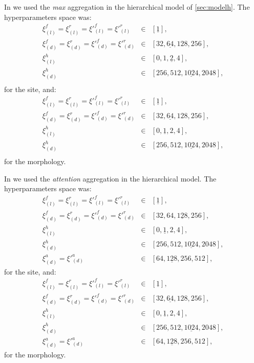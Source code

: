 In \maxh{} we used the \emph{max} aggregation in the hierarchical
model of \cref{sec:modelh}. The hyperparameters space was:
\begin{align*}
  \xi_{(l)}^f=\xi_{(l)}^r=\xi'^f_{(l)}=\xi'^r_{(l)}&\in&[\underline{1}],\\
  \xi_{(d)}^f=\xi_{(d)}^r=\xi'^f_{(d)}=\xi'^r_{(d)}&\in&[32,\underline{64},128,256],\\
  \xi_{(l)}^h&\in&[0,1,\underline{2},4],\\
  \xi_{(d)}^h&\in&[256,512,\underline{1024},2048],\\
\end{align*}
for the site, and:
\begin{align*}
  \xi_{(l)}^f=\xi_{(l)}^r=\xi'^f_{(l)}=\xi'^r_{(l)}&\in&[\underline{1}],\\
  \xi_{(d)}^f=\xi_{(d)}^r=\xi'^f_{(d)}=\xi'^r_{(d)}&\in&[32,\underline{64},128,256],\\
  \xi_{(l)}^h&\in&[0,\underline{1},2,4],\\
  \xi_{(d)}^h&\in&[256,512,\underline{1024},2048],\\
\end{align*}
for the morphology.

In \softmaxh{} we used the \emph{attention} aggregation in the
hierarchical model. The hyperparameters space was:
\begin{align*}
  \xi_{(l)}^f=\xi_{(l)}^r=\xi'^f_{(l)}=\xi'^r_{(l)}&\in&[\underline{1}],\\
  \xi_{(d)}^f=\xi_{(d)}^r=\xi'^f_{(d)}=\xi'^r_{(d)}&\in&[32,64,\underline{128},256],\\
  \xi_{(l)}^h&\in&[0,\underline{1},2,4],\\
  \xi_{(d)}^h&\in&[256,512,\underline{1024},2048],\\
  \xi_{(d)}^a=\xi'^a_{(d)}&\in&[64,\underline{128},256,512],
\end{align*}
for the site, and:
\begin{align*}
  \xi_{(l)}^f=\xi_{(l)}^r=\xi'^f_{(l)}=\xi'^r_{(l)}&\in&[\underline{1}],\\
  \xi_{(d)}^f=\xi_{(d)}^r=\xi'^f_{(d)}=\xi'^r_{(d)}&\in&[32,\underline{64},128,256],\\
  \xi_{(l)}^h&\in&[0,\underline{1},2,4],\\
  \xi_{(d)}^h&\in&[256,512,\underline{1024},2048],\\
  \xi_{(d)}^a=\xi'^a_{(d)}&\in&[64,\underline{128},256,512],
\end{align*}
for the morphology.

